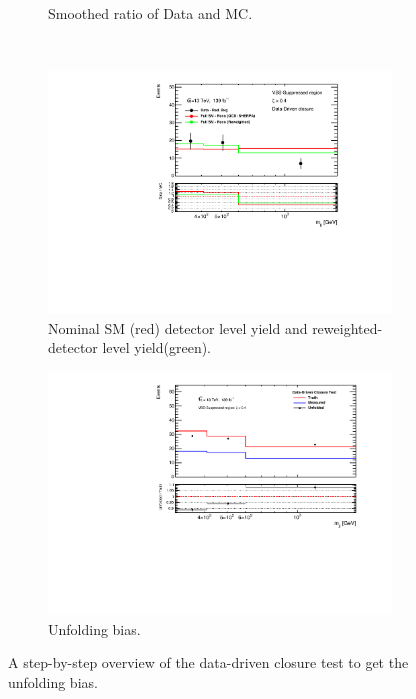 \begin{figure}[htb]
\begin{subfigure}{.48\textwidth}
        \caption{Smoothed ratio of Data and MC. \label{fig:ddclosure_DataMCSmooth} }
    \end{subfigure}\\
    \begin{subfigure}{.48\textwidth}
        \centering
        \includegraphics[width=.9\linewidth]{figures/Analysis/Unfolding/DDClosure_VBS_Suppressed_Reweighted.pdf}
        \caption{ Nominal SM (red) detector level yield and reweighted-detector level yield(green). \label{fig:ddclosure_DataMCReweighted} }
    \end{subfigure}
    \begin{subfigure}{.48\textwidth}
        \centering
        \includegraphics[width=.9\linewidth]{figures/Analysis/Unfolding/DDClosure_VBS_Suppressed_Bias.pdf}
        \caption{Unfolding bias. \label{fig:ddclosure_FinalBias} }
    \end{subfigure}
    \caption{ A step-by-step overview of the data-driven closure test to get the unfolding bias. \label{fig:unfolding_ddclosure}}
\end{figure}
